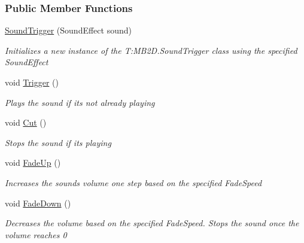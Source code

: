 \subsubsection*{Public Member Functions}
\begin{DoxyCompactItemize}
\item 
\hyperlink{class_m_b2_d_1_1_sound_trigger_ae52791ea1d0f84f11dac81a8e7f34d64}{Sound\+Trigger} (Sound\+Effect sound)
\begin{DoxyCompactList}\small\item\em Initializes a new instance of the T\+:\+M\+B2\+D.\+Sound\+Trigger class using the specified Sound\+Effect \end{DoxyCompactList}\item 
void \hyperlink{class_m_b2_d_1_1_sound_trigger_a1387225550eb222ebbf70a8e097907a3}{Trigger} ()
\begin{DoxyCompactList}\small\item\em Plays the sound if it\textquotesingle{}s not already playing \end{DoxyCompactList}\item 
void \hyperlink{class_m_b2_d_1_1_sound_trigger_ae8846b39ac8469f479f8d64cbec25a11}{Cut} ()
\begin{DoxyCompactList}\small\item\em Stops the sound if it\textquotesingle{}s playing \end{DoxyCompactList}\item 
void \hyperlink{class_m_b2_d_1_1_sound_trigger_a677d10464891b21b44da3811430d5bea}{Fade\+Up} ()
\begin{DoxyCompactList}\small\item\em Increases the sounds volume one step based on the specified Fade\+Speed \end{DoxyCompactList}\item 
void \hyperlink{class_m_b2_d_1_1_sound_trigger_aca40e191ef7b6cd594d43bb36ae787e9}{Fade\+Down} ()
\begin{DoxyCompactList}\small\item\em Decreases the volume based on the specified Fade\+Speed. Stops the sound once the volume reaches 0 \end{DoxyCompactList}\end{DoxyCompactItemize}
